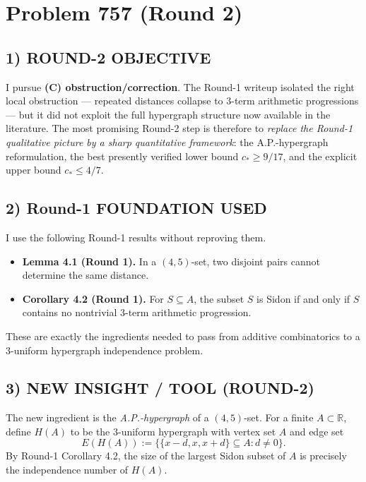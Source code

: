 \section*{Problem 757 (Round 2)}

\subsection*{1) ROUND-2 OBJECTIVE}
I pursue \textbf{(C) obstruction/correction}. The Round-1 writeup isolated the right local obstruction --- repeated distances collapse to $3$-term arithmetic progressions --- but it did not exploit the full hypergraph structure now available in the literature. The most promising Round-2 step is therefore to \emph{replace the Round-1 qualitative picture by a sharp quantitative framework}: the A.P.-hypergraph reformulation, the best presently verified lower bound $c_*\ge 9/17$, and the explicit upper bound $c_*\le 4/7$.

\subsection*{2) Round-1 FOUNDATION USED}
I use the following Round-1 results without reproving them.
\begin{itemize}
\item \textbf{Lemma 4.1 (Round 1).} In a $(4,5)$-set, two disjoint pairs cannot determine the same distance.
\item \textbf{Corollary 4.2 (Round 1).} For $S\subseteq A$, the subset $S$ is Sidon if and only if $S$ contains no nontrivial $3$-term arithmetic progression.
\end{itemize}
These are exactly the ingredients needed to pass from additive combinatorics to a $3$-uniform hypergraph independence problem.

\subsection*{3) NEW INSIGHT / TOOL (ROUND-2)}
The new ingredient is the \emph{A.P.-hypergraph} of a $(4,5)$-set. For a finite $A\subset\mathbb R$, define $H(A)$ to be the $3$-uniform hypergraph with vertex set $A$ and edge set
\[
E(H(A)):=\bigl\{\{x-d,x,x+d\}\subseteq A: d\neq 0\bigr\}.
\]
By Round-1 Corollary 4.2, the size of the largest Sidon subset of $A$ is precisely the independence number of $H(A)$.

